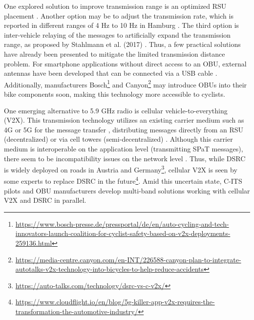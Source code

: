 One explored solution to improve transmission range is an optimized RSU placement \cite{mehar_optimized_2015, massobrio_smart_2015, al-ezaly_optimal_2020}. Another option may be to adjust the transmission rate, which is reported in different ranges of 4 Hz \cite{stahlmann_multi-hop_2017} to 10 Hz in Hamburg \cite{stegen_ideas_2021}. The third option is inter-vehicle relaying of the messages to artificially expand the transmission range, as proposed by Stahlmann et al. (2017) \cite{stahlmann_multi-hop_2017}. Thus, a few practical solutions have already been presented to mitigate the limited transmission distance problem. For smartphone applications without direct access to an OBU, external antennas have been developed that can be connected via a USB cable \cite{kim_vulnerable_2017}. Additionally, manufacturers Bosch\footnote{\url{https://www.bosch-presse.de/pressportal/de/en/auto-cycling-and-tech-innovators-launch-coalition-for-cyclist-safety-based-on-v2x-deployments-259136.html}} and Canyon\footnote{\url{https://media-centre.canyon.com/en-INT/226588-canyon-plan-to-integrate-autotalks-v2x-technology-into-bicycles-to-help-reduce-accidents}} may introduce OBUs into their bike components soon, making this technology more accessible to cyclists.

One emerging alternative to 5.9 GHz radio is cellular vehicle-to-everything (V2X). This transmission technology utilizes an existing carrier medium such as 4G or 5G for the message transfer \cite{xia_field_2012, zweck_traffic_2013, bhattacharyya_assessing_2022}, distributing messages directly from an RSU (decentralized) \cite{bohm_radio_2017} or via cell towers (semi-decentralized) \cite{strobl_c-its_2019, jacob_ivs-kom_2020}. Although this carrier medium is interoperable on the application level (transmitting SPaT messages), there seem to be incompatibility issues on the network level \cite{bohm_radio_2017}. Thus, while DSRC is widely deployed on roads in Austria and Germany\footnote{\url{https://auto-talks.com/technology/dsrc-vs-c-v2x/}}, cellular V2X is seen by some experts to replace DSRC in the future\footnote{\url{https://www.cloudflight.io/en/blog/5g-killer-app-v2x-requires-the-transformation-the-automotive-industry/}}. Amid this uncertain state, C-ITS pilots \cite{strobl_c-its_2019} and OBU manufacturers \cite{jacob_ivs-kom_2020} develop multi-band solutions working with cellular V2X and DSRC in parallel.

